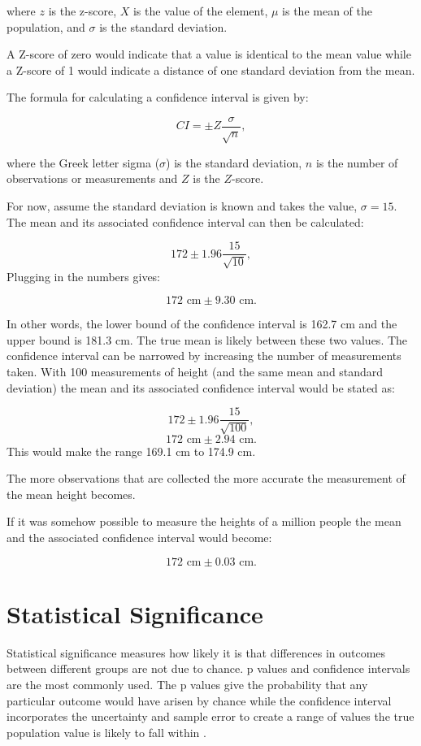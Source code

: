\documentclass[
]{book}
\begin{document}
where \(z\) is the z-score, \(X\) is the value of the element, \(\mu\) is the mean of the population, and \(\sigma\) is the standard deviation.

A Z-score of zero would indicate that a value is identical to the mean value while a Z-score of 1 would indicate a distance of one standard deviation from the mean.

The formula for calculating a confidence interval is given by:

\[CI= \pm Z\frac{\sigma}{\sqrt{n}},\]

where the Greek letter sigma (\(\sigma\)) is the standard deviation, \(n\) is the number of observations or measurements and \(Z\) is the \(Z\)-score.

For now, assume the standard deviation is known and takes the value, \(\sigma = 15\). The mean and its associated confidence interval can then be calculated:

\[172 \pm 1.96 \frac{15}{\sqrt{10}},\]
Plugging in the numbers gives:

\[172 \textrm{ cm}\pm 9.30 \textrm{ cm}.\]

In other words, the lower bound of the confidence interval is 162.7 cm and the upper bound is 181.3 cm. The true mean is likely between these two values. The confidence interval can be narrowed by increasing the number of measurements taken. With 100 measurements of height (and the same mean and standard deviation) the mean and its associated confidence interval would be stated as:

\[172 \pm 1.96 \frac{15}{\sqrt{100}},\]
\[172 \textrm{ cm} \pm 2.94 \textrm{ cm}.\]
This would make the range 169.1 cm to 174.9 cm.

The more observations that are collected the more accurate the measurement of the mean height becomes.

If it was somehow possible to measure the heights of a million people the mean and the associated confidence interval would become:

\[172 \textrm{ cm} \pm 0.03 \textrm{ cm}.\]

\hypertarget{signif}{%
\section{Statistical Significance}\label{signif}}

Statistical significance measures how likely it is that differences in outcomes between different groups are not due to chance. p values and confidence intervals are the most commonly used. The p values give the probability that any particular outcome would have arisen by chance while the confidence interval incorporates the uncertainty and sample error to create a range of values the true population value is likely to fall within \citep{Leung201}.
\end{document}
